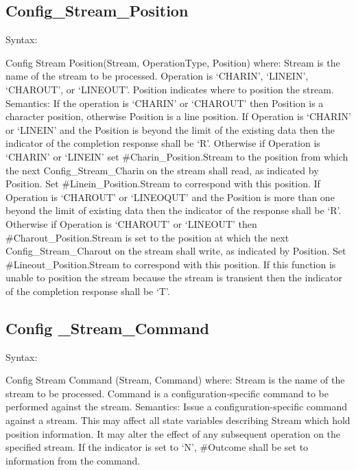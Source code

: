 \hypertarget{config_stream_position}{%
\subsection{Config\_Stream\_Position}\label{config_stream_position}}

Syntax:

Config Stream Position(Stream, OperationType, Position) where: Stream is
the name of the stream to be processed. Operation is `CHARIN', `LINEIN',
`CHAROUT', or `LINEOUT'. Position indicates where to position the
stream. Semantics: If the operation is `CHARIN' or `CHAROUT' then
Position is a character position, otherwise Position is a line position.
If Operation is `CHARIN' or `LINEIN' and the Position is beyond the
limit of the existing data then the indicator of the completion response
shall be `R'. Otherwise if Operation is `CHARIN' or `LINEIN' set
\#Charin\_Position.Stream to the position from which the next
Config\_Stream\_Charin on the stream shall read, as indicated by
Position. Set \#Linein\_Position.Stream to correspond with this
position. If Operation is `CHAROUT' or `LINEOQUT' and the Position is
more than one beyond the limit of existing data then the indicator of
the response shall be `R'. Otherwise if Operation is `CHAROUT' or
`LINEOUT' then \#Charout\_Position.Stream is set to the position at
which the next Config\_Stream\_Charout on the stream shall write, as
indicated by Position. Set \#Lineout\_Position.Stream to correspond with
this position. If this function is unable to position the stream because
the stream is transient then the indicator of the completion response
shall be `T'.

\hypertarget{config-_stream_command}{%
\subsection{Config \_Stream\_Command}\label{config-_stream_command}}

Syntax:

Config Stream Command (Stream, Command) where: Stream is the name of the
stream to be processed. Command is a configuration-specific command to
be performed against the stream. Semantics: Issue a
configuration-specific command against a stream. This may affect all
state variables describing Stream which hold position information. It
may alter the effect of any subsequent operation on the specified
stream. If the indicator is set to `N', \#Outcome shall be set to
information from the command.

